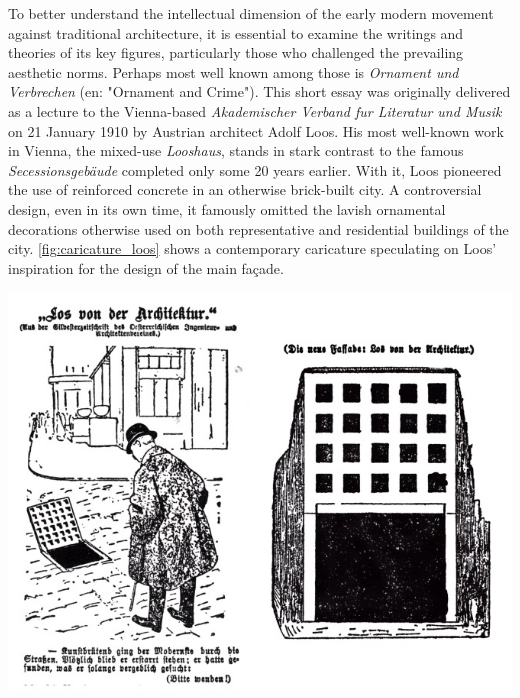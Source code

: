 \documentclass[a4paper]{article}
\begin{document}
\begin{mdframed}[linewidth=1pt, roundcorner=5pt, innerleftmargin=10pt, innerrightmargin=10pt, innertopmargin=10pt, innerbottommargin=10pt, linecolor=black, backgroundcolor=white, userdefinedwidth=\textwidth]
    To better understand the intellectual dimension of the early modern movement against traditional architecture, it is essential to examine the writings and theories of its key figures, particularly those who challenged the prevailing aesthetic norms. Perhaps most well known among those is \textit{Ornament und Verbrechen} \cite{loos_ornament_1908} (en: "Ornament and Crime"). This short essay was originally delivered as a lecture to the Vienna-based \textit{Akademischer Verband fur Literatur und Musik} on 21 January 1910 by Austrian architect Adolf Loos. His most well-known work in Vienna, the mixed-use \textit{Looshaus}, stands in stark contrast to the famous \textit{Secessionsgebäude} completed only some 20 years earlier. With it, Loos pioneered the use of reinforced concrete in an otherwise brick-built city. A controversial design, even in its own time, it famously omitted the lavish ornamental decorations otherwise used on both representative and residential buildings of the city. \cref{fig:caricature_loos} shows a contemporary caricature speculating on Loos' inspiration for the design of the main façade.

    \centering %
    \includegraphics[width=0.7\linewidth]{./figures/caricature_loos.jpg} %
    \label{fig:caricature_loos}
\end{mdframed}
\end{document}
